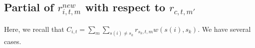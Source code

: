 \documentclass[12pt]{article}
\begin{document}








\subsection{Partial of $r^{new}_{i,t,m}$ with respect to $r_{c,t,m'}$}

Here, we recall that $C_{i,t}=\sum_m \sum_{s(i) \neq s_k} r_{s_k,t,m} w(s(i), s_k)$. We have several cases.
\end{document}
